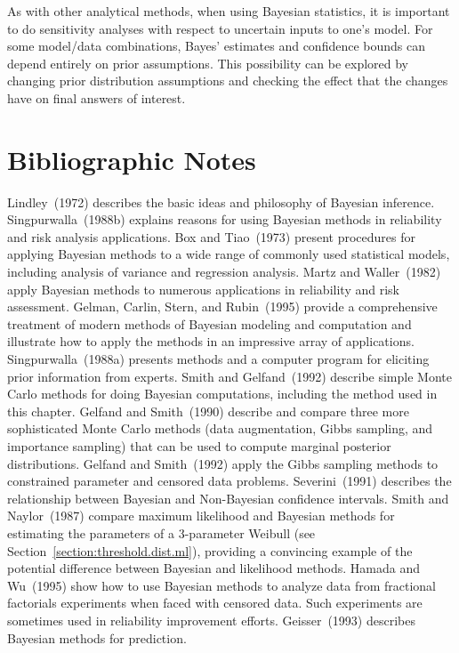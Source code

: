 As with other analytical methods, when using Bayesian statistics, it
is important to do sensitivity analyses with respect to uncertain
inputs to one's model.  For some model/data combinations, Bayes'
estimates and confidence bounds can depend entirely on prior
assumptions.  This possibility can be explored by changing prior
distribution assumptions and checking the effect that the changes
have on final answers of interest.


\section*{Bibliographic Notes}
Lindley~(1972) describes the basic ideas and philosophy of Bayesian
inference. Singpurwalla~(1988b) explains reasons for using Bayesian
methods in reliability and risk analysis applications. Box and
Tiao~(1973) present procedures for applying Bayesian methods to a
wide range of commonly used statistical models, including analysis
of variance and regression analysis. Martz and Waller~(1982) apply
Bayesian methods to numerous applications in reliability and risk
assessment.  Gelman, Carlin, Stern, and Rubin~(1995) provide a
comprehensive treatment of modern methods of Bayesian modeling and
computation and illustrate how to apply the methods in an impressive
array of applications.  Singpurwalla~(1988a) presents methods and a
computer program for eliciting prior information from experts.
Smith and Gelfand~(1992) describe simple Monte Carlo methods for
doing Bayesian computations, including the method used in this
chapter. Gelfand and Smith~(1990) describe and compare three more
sophisticated Monte Carlo methods (data augmentation, Gibbs
sampling, and importance sampling) that can be used to compute
marginal posterior distributions.  Gelfand and Smith~(1992) apply
the Gibbs sampling methods to constrained parameter and censored
data problems. Severini~(1991) describes the relationship between
Bayesian and Non-Bayesian confidence intervals. Smith and
Naylor~(1987) compare maximum likelihood and Bayesian methods for
estimating the parameters of a 3-parameter Weibull (see
Section~\ref{section:threshold.dist.ml}), providing a convincing
example of the potential difference between Bayesian and likelihood
methods.  Hamada and Wu~(1995) show how to use Bayesian methods to
analyze data from fractional factorials experiments when faced with
censored data.  Such experiments are sometimes used in reliability
improvement efforts. Geisser~(1993) describes Bayesian methods for
prediction.

